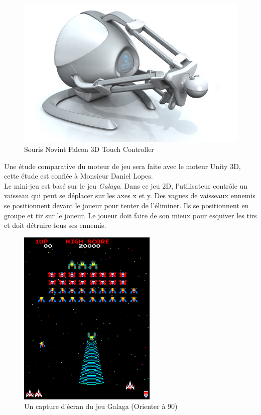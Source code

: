 \documentclass[11pt, a4paper]{article}
\begin{document}
\begin{figure}[h]
	\begin{center}
	\includegraphics[scale=.5]{falcon}
	\caption{Souris Novint Falcon 3D Touch Controller}
	\end{center}
\end{figure}

Une étude comparative du moteur de jeu sera faite avec le moteur Unity 3D, cette étude est confiée à Monsieur Daniel Lopes.\\[0.3cm]
Le mini-jeu est basé sur le jeu \textit{Galaga}. Dans ce jeu 2D, l'utilisateur contrôle un vaisseau qui peut se déplacer sur les axes x et y. Des vagues de vaisseaux ennemis se positionnent devant le joueur pour tenter de l'éliminer. Ils se positionnent en groupe et tir sur le joueur. Le joueur doit faire de son mieux pour esquiver les tirs et doit détruire tous ses ennemis.

\begin{figure}[h]
	\begin{center}
	\includegraphics[scale=1, angle=90]{Galaga}
	\caption{Un capture d'écran du jeu Galaga (Orienter à 90\degre)}
	\end{center}
\end{figure}
\newpage
\end{document}
